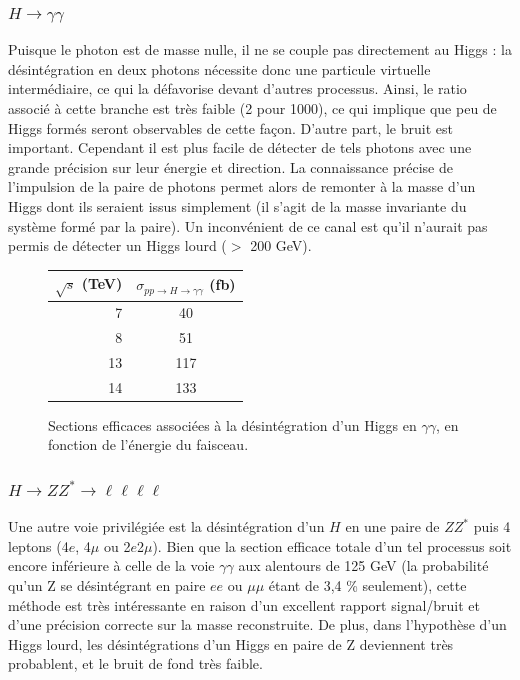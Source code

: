 \documentclass[11pt]{article} %
\begin{document}
\subsubsection{$H \to \gamma \gamma$}

Puisque le photon est de masse nulle, il ne se couple pas directement au Higgs : la désintégration en deux photons nécessite donc une particule virtuelle intermédiaire, ce qui la défavorise devant d'autres processus. Ainsi, le ratio associé à cette branche est très faible (2 pour 1000), ce qui implique que peu de Higgs formés seront observables de cette façon. D'autre part, le bruit est important.
Cependant il est plus facile de détecter de tels photons avec une grande précision sur leur énergie et direction. La connaissance précise de l'impulsion de la paire de photons permet alors de remonter à la masse d'un Higgs dont ils seraient issus simplement (il s'agit de la masse invariante du système formé par la paire). Un inconvénient de ce canal est qu'il n'aurait pas permis de détecter un Higgs lourd ($>$ 200 GeV).

\begin{figure}[H]
\centering
\begin{tabular}{|r|c|} 
   \hline
   $\sqrt{s}$ (TeV) & $\sigma_{pp \to H \to \gamma \gamma}$ (fb) \\
    \hline
   7 &  40\\
\hline
   8 & 51 \\
\hline
   13 & 117  \\
\hline
   14 & 133 \\
  \hline
\end{tabular}
\caption{Sections efficaces associées à la désintégration d'un Higgs en $\gamma \gamma$, en fonction de l'énergie du faisceau.}
\end{figure}



\subsubsection{$H \to ZZ^* \to \ell \ell \ell \ell$}

Une autre voie privilégiée est la désintégration d'un $H$ en une paire de $ZZ^*$ puis 4 leptons (4$e$, 4$\mu$ ou 2$e$2$\mu$). Bien que la section efficace totale d'un tel processus soit encore inférieure à celle de la voie $\gamma \gamma$ aux alentours de 125 GeV  (la probabilité qu'un Z se désintégrant en paire $ee$ ou $\mu \mu$ étant de 3,4 \% seulement), cette méthode est très intéressante en raison d'un excellent rapport signal/bruit et d'une précision correcte sur la masse reconstruite. De plus, dans l'hypothèse d'un Higgs lourd, les désintégrations d'un Higgs en paire de Z deviennent très probablent, et le bruit de fond très faible.
\end{document}
